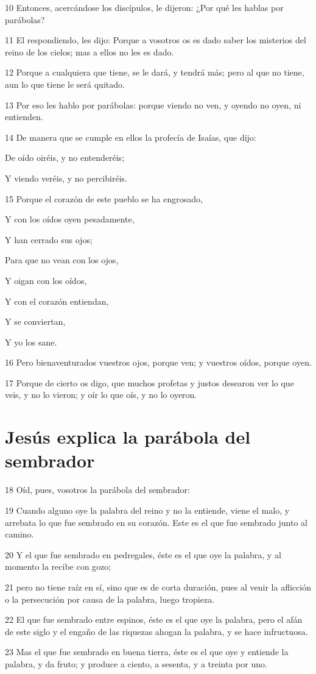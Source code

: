 \par 10 Entonces, acercándose los discípulos, le dijeron: ¿Por qué les hablas por parábolas?
\par 11 El respondiendo, les dijo: Porque a vosotros os es dado saber los misterios del reino de los cielos; mas a ellos no les es dado.
\par 12 Porque a cualquiera que tiene, se le dará, y tendrá más; pero al que no tiene, aun lo que tiene le será quitado.
\par 13 Por eso les hablo por parábolas: porque viendo no ven, y oyendo no oyen, ni entienden.
\par 14 De manera que se cumple en ellos la profecía de Isaías, que dijo:
\par De oído oiréis, y no entenderéis;
\par Y viendo veréis, y no percibiréis.
\par 15 Porque el corazón de este pueblo se ha engrosado,
\par Y con los oídos oyen pesadamente,
\par Y han cerrado sus ojos;
\par Para que no vean con los ojos,
\par Y oigan con los oídos,
\par Y con el corazón entiendan,
\par Y se conviertan,
\par Y yo los sane.
\par 16 Pero bienaventurados vuestros ojos, porque ven; y vuestros oídos, porque oyen.
\par 17 Porque de cierto os digo, que muchos profetas y justos desearon ver lo que veis, y no lo vieron; y oír lo que oís, y no lo oyeron.

\section*{Jesús explica la parábola del sembrador}

\par 18 Oíd, pues, vosotros la parábola del sembrador:
\par 19 Cuando alguno oye la palabra del reino y no la entiende, viene el malo, y arrebata lo que fue sembrado en su corazón. Este es el que fue sembrado junto al camino.
\par 20 Y el que fue sembrado en pedregales, éste es el que oye la palabra, y al momento la recibe con gozo;
\par 21 pero no tiene raíz en sí, sino que es de corta duración, pues al venir la aflicción o la persecución por causa de la palabra, luego tropieza.
\par 22 El que fue sembrado entre espinos, éste es el que oye la palabra, pero el afán de este siglo y el engaño de las riquezas ahogan la palabra, y se hace infructuosa.
\par 23 Mas el que fue sembrado en buena tierra, éste es el que oye y entiende la palabra, y da fruto; y produce a ciento, a sesenta, y a treinta por uno.

